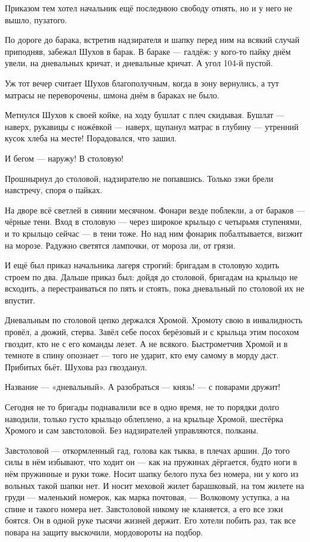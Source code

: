 Приказом тем хотел начальник ещё последнюю свободу отнять, но и у него не вышло, пузатого.

По дороге до барака, встретив надзирателя и шапку перед ним на всякий случай приподняв, 
забежал Шухов в барак. В бараке --- галдёж: у кого-то пайку днём увели, на дневальных кричат, и 
дневальные кричат. А угол 104-й пустой.

Уж тот вечер считает Шухов благополучным, когда в зону вернулись, а тут матрасы не 
переворочены, шмона днём в бараках не было.

Метнулся Шухов к своей койке, на ходу бушлат с плеч скидывая. Бушлат --- наверх, рукавицы с 
ножёвкой --- наверх, щупанул матрас в глубину --- утренний кусок хлеба на месте! Порадовался, 
что зашил.

И бегом --- наружу! В столовую!

Прошнырнул до столовой, надзирателю не попавшись. Только зэки брели навстречу, споря о 
пайках.

На дворе всё светлей в сиянии месячном. Фонари везде поблекли, а от бараков --- чёрные тени. 
Вход в столовую --- через широкое крыльцо с четырьмя ступенями, и то крыльцо сейчас --- в тени 
тоже. Но над ним фонарик побалтывается, визжит на морозе. Радужно светятся лампочки, от 
мороза ли, от грязи.

И ещё был приказ начальника лагеря строгий: бригадам в столовую ходить строем по два. Дальше 
приказ был: дойдя до столовой, бригадам на крыльцо не всходить, а перестраиваться по пять и 
стоять, пока дневальный по столовой их не впустит.

Дневальным по столовой цепко держался Хромой. Хромоту свою в инвалидность провёл, а дюжий, 
стерва. Завёл себе посох берёзовый и с крыльца этим посохом гвоздит, кто не с его команды 
лезет. А не всякого. Быстрометчив Хромой и в темноте в спину опознает --- того не ударит, кто 
ему самому в морду даст. Прибитых бьёт. Шухова раз гвозданул.

Название --- «дневальный». А разобраться --- князь! --- с поварами дружит!

Сегодня не то бригады поднавалили все в одно время, не то порядки долго наводили, только 
густо крыльцо облеплено, а на крыльце Хромой, шестёрка Хромого и сам завстоловой. Без 
надзирателей управляются, полканы.

Завстоловой --- откормленный гад, голова как тыква, в плечах аршин. До того силы в нём 
избывают, что ходит он --- как на пружинах дёргается, будто ноги в нём пружинные и руки тоже. 
Носит шапку белого пуха без номера, ни у кого из вольных такой шапки нет. И носит меховой 
жилет барашковый, на том жилете на груди --- маленький номерок, как марка почтовая, --- 
Волковому уступка, а на спине и такого номера нет. Завстоловой никому не кланяется, а его все 
зэки боятся. Он в одной руке тысячи жизней держит. Его хотели побить раз, так все повара на 
защиту выскочили, мордовороты на подбор.

